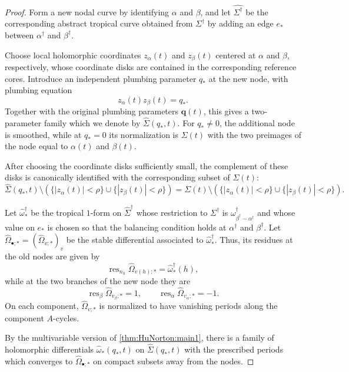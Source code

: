 \documentclass[12pt]{amsart}
\numberwithin{equation}{section}
\theoremstyle{definition}
\def\res{\operatorname{res}}
\def\trop{\dagger}
\def\mcurve{\Sigma}
\def\tropmcurve{\mcurve^\trop}
\begin{document}
\begin{proof}

Form a new nodal curve by identifying $\alpha$ and $\beta$, and let
$\widehat{\tropmcurve}$ be the corresponding abstract tropical curve obtained
from $\tropmcurve$ by adding an edge $e_*$ between
$\alpha^\trop$ and $\beta^\trop$.

Choose local holomorphic coordinates $z_\alpha(t)$ and $z_\beta(t)$ centered
at $\alpha$ and $\beta$, respectively, whose coordinate disks are
contained in the corresponding reference cores. Introduce an
independent plumbing parameter $q_*$ at the new node, with plumbing
equation
\[
z_\alpha(t) z_\beta(t)=q_*.
\]
Together with the original plumbing parameters $\bm q(t)$, this gives a
two-parameter family which we denote by
$
\widehat\mcurve(q_*,t).
$
For $q_*\neq0$, the additional node is smoothed, while at $q_*=0$ its
normalization is $\mcurve(t)$ with the two preimages of the node equal
to $\alpha(t)$ and $\beta(t)$.

After choosing the coordinate disks sufficiently small, the complement
of these disks is canonically identified with the corresponding subset
of $\mcurve(t)$:
\begin{equation}\label{eq:two-paramter-core}
\widehat\mcurve(q_*,t)
\setminus
\left(
\{|z_\alpha(t)|<\rho\}
\cup
\{|z_\beta(t)|<\rho\}
\right)
=
\mcurve(t)
\setminus
\left(
\{|z_\alpha(t)|<\rho\}
\cup
\{|z_\beta(t)|<\rho\}
\right).
\end{equation}

Let
$
\widehat\omega_*^\trop
$
be the tropical $1$-form on $\widehat\tropmcurve$ whose restriction to
$\tropmcurve$ is
$
\omega_{\beta^\trop-\alpha^\trop}^\trop
$
and whose value on $e_*$ is chosen so that the balancing condition
holds at $\alpha^\trop$ and $\beta^\trop$. Let
$
\widehat\Omega_{\bullet;*}
=
(\widehat\Omega_{v;*})_v
$
be the stable differential associated to
$\widehat\omega_*^\trop$. Thus, its residues at the old nodes are given
by
\[
\res_{n_h}\widehat\Omega_{v(h);*}
=
\widehat\omega_*^\trop(h),
\]
while at the two branches of the new node they are
\[
\res_{\beta}\widehat\Omega_{v_\beta;*}=1,
\qquad
\res_{\alpha}\widehat\Omega_{v_\alpha;*}=-1.
\]
On each component, $\widehat\Omega_{v;*}$ is normalized to have
vanishing periods along the component $A$-cycles.

By the multivariable version of \cref{thm:HuNorton:main1}, there is a
family of holomorphic differentials
$
\widehat\omega_*(q_*,t)
$
on $\widehat\mcurve(q_*,t)$ with the prescribed periods which converges to
$\widehat\Omega_{\bullet;*}$ on compact subsets away from the nodes.


\end{proof}
\end{document}
